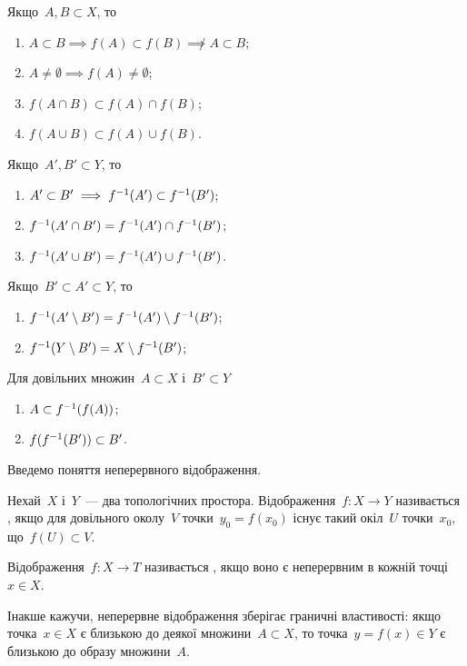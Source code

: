Якщо~$A, B \subset X$, то
\begin{enumerate}
\item $A \subset B \implies f(A) \subset f(B) \not\implies A \subset B$;
\item $A \ne \emptyset \implies f(A) \ne \emptyset$;
\item $f(A \cap B) \subset f(A) \cap f(B)$;
\item $f(A \cup B) \subset f(A) \cup f(B)$.
\end{enumerate}
Якщо~$A', B' \subset Y$, то
\begin{enumerate}
\item $A' \subset B' \implies f^{-1}(A') \subset f^{-1}(B')$;
\item $f^{-1}(A' \cap B') = f^{-1}(A') \cap f^{-1}(B')$;
\item $f^{-1}(A' \cup B') = f^{-1}(A') \cup f^{-1}(B')$.
\end{enumerate}
Якщо~$B' \subset A' \subset Y$, то
\begin{enumerate}
\item $f^{-1}(A' \setminus B') = f^{-1}(A') \setminus f^{-1}(B')$;
\item $f^{-1}(Y \setminus B') = X \setminus f^{-1}(B')$;
\end{enumerate}
Для довільних множин~$A \subset X$ і~$B' \subset Y$
\begin{enumerate}
\item $A \subset f^{-1}(f(A))$;
\item $f(f^{-1}(B')) \subset B'$.
\end{enumerate}

Введемо поняття неперервного відображення.

\begin{definition}
Нехай~$X$ і~$Y$~--- два топологічних простора.
Відображення~$f: X \to Y$ називається , якщо для довільного околу~$V$ точки~$y_0 = f(x_0)$
існує такий окіл~$U$ точки~$x_0$, що~$f(U) \subset V$.
\end{definition}

\begin{definition}
Відображення~$f: X \to T$ називається ,
якщо воно є неперервним в кожній точці~$x \in X$.
\end{definition}

Інакше кажучи, неперервне відображення зберігає
граничні властивості: якщо точка~$x \in X$ є близькою до
деякої множини~$A \subset X$, то точка~$y = f(x) \in Y$ є близькою
до образу множини~$A$.

